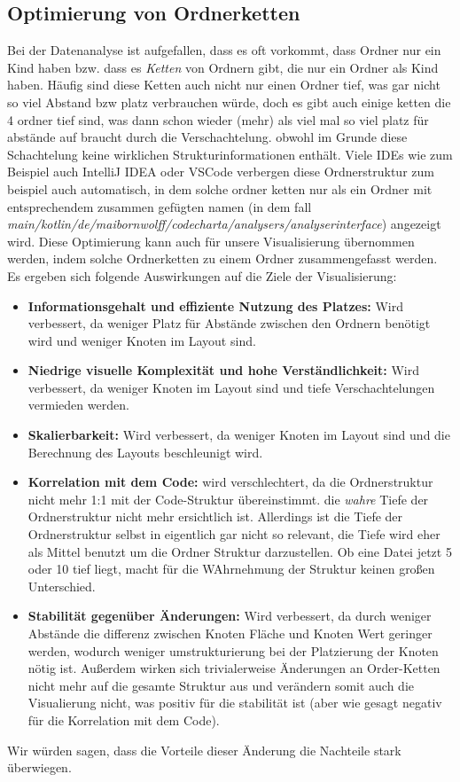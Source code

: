 \subsection{Optimierung von Ordnerketten} \label{sec:OrderKettenOptimierung}
Bei der Datenanalyse ist aufgefallen, dass es oft vorkommt, dass Ordner nur ein Kind haben bzw. dass es \textit{Ketten} von Ordnern gibt, die nur ein Ordner als Kind haben. Häufig sind diese Ketten auch nicht nur einen Ordner tief, was gar nicht so viel Abstand bzw platz verbrauchen würde, doch es gibt auch einige ketten die 4 ordner tief sind, was dann schon wieder (mehr) als viel mal so viel platz für abstände auf braucht durch die Verschachtelung.
obwohl im Grunde diese Schachtelung keine wirklichen Strukturinformationen enthält. Viele IDEs wie zum Beispiel auch IntelliJ IDEA oder VSCode verbergen diese Ordnerstruktur zum beispiel auch automatisch, in dem solche ordner ketten nur als ein Ordner mit entsprechendem zusammen gefügten namen (in dem fall \textit{main/kotlin/de/maibornwolff/codecharta/analysers/analyserinterface}) angezeigt wird.
Diese Optimierung kann auch für unsere Visualisierung übernommen werden, indem solche Ordnerketten zu einem Ordner zusammengefasst werden. 
Es ergeben sich folgende Auswirkungen auf die Ziele der Visualisierung:
\begin{itemize}
\item \textbf{Informationsgehalt und effiziente Nutzung des Platzes:} Wird verbessert, da weniger Platz für Abstände zwischen den Ordnern benötigt wird und weniger Knoten im Layout sind. 
    \item \textbf{Niedrige visuelle Komplexität und hohe Verständlichkeit:} Wird verbessert, da weniger Knoten im Layout sind und tiefe Verschachtelungen vermieden werden.
    \item \textbf{Skalierbarkeit:} Wird verbessert, da weniger Knoten im Layout sind und die Berechnung des Layouts beschleunigt wird.
    \item \textbf{Korrelation mit dem Code:} wird verschlechtert, da die Ordnerstruktur nicht mehr 1:1 mit der Code-Struktur übereinstimmt. die \textit{wahre} Tiefe der Ordnerstruktur nicht mehr ersichtlich ist. Allerdings ist die Tiefe der Ordnerstruktur selbst in eigentlich gar nicht so relevant, die Tiefe wird eher als Mittel benutzt um die Ordner Struktur darzustellen. Ob eine Datei jetzt 5 oder 10 tief liegt, macht für die WAhrnehmung der Struktur keinen großen Unterschied.
    \item \textbf{Stabilität gegenüber Änderungen:} Wird verbessert, da durch weniger Abstände die differenz zwischen Knoten Fläche und Knoten Wert geringer werden, wodurch weniger umstrukturierung bei der Platzierung der Knoten nötig ist. Außerdem wirken sich trivialerweise Änderungen an Order-Ketten nicht mehr auf die gesamte Struktur aus und verändern somit auch die Visualierung nicht, was positiv für die stabilität ist (aber wie gesagt negativ für die Korrelation mit dem Code).
\end{itemize}
Wir würden sagen, dass die Vorteile dieser Änderung die Nachteile stark überwiegen.

